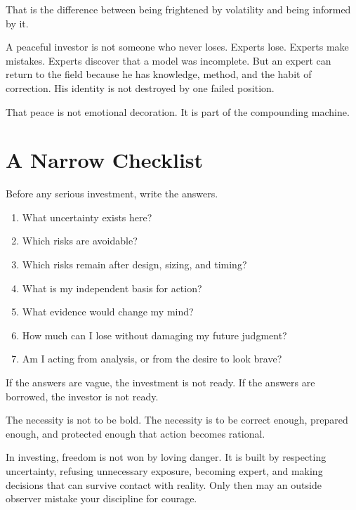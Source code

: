 That is the difference between being frightened by volatility and being informed by it.

A peaceful investor is not someone who never loses. Experts lose. Experts make mistakes. Experts discover that a model was incomplete. But an expert can return to the field because he has knowledge, method, and the habit of correction. His identity is not destroyed by one failed position.

That peace is not emotional decoration. It is part of the compounding machine.

\section*{A Narrow Checklist}

Before any serious investment, write the answers.

\begin{enumerate}
\item What uncertainty exists here?
\item Which risks are avoidable?
\item Which risks remain after design, sizing, and timing?
\item What is my independent basis for action?
\item What evidence would change my mind?
\item How much can I lose without damaging my future judgment?
\item Am I acting from analysis, or from the desire to look brave?
\end{enumerate}

If the answers are vague, the investment is not ready. If the answers are borrowed, the investor is not ready.

The necessity is not to be bold. The necessity is to be correct enough, prepared enough, and protected enough that action becomes rational.

In investing, freedom is not won by loving danger. It is built by respecting uncertainty, refusing unnecessary exposure, becoming expert, and making decisions that can survive contact with reality. Only then may an outside observer mistake your discipline for courage.
